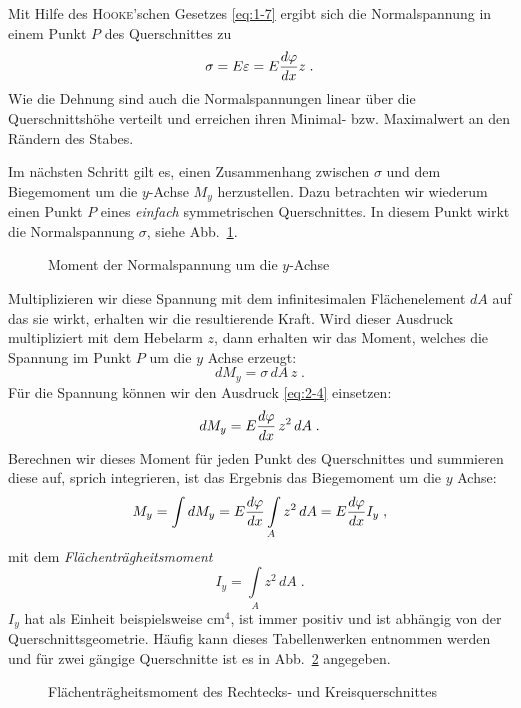 Mit Hilfe des \textsc{Hooke}'schen Gesetzes \eqref{eq:1-7} ergibt sich die Normalspannung in einem Punkt $P$ des Querschnittes zu
%
\begin{equation}
\sigma = E\varepsilon = E\dfrac{d\varphi}{dx}z \; .
\label{eq:2-4}
\end{equation}
%
Wie die Dehnung sind auch die Normalspannungen linear über die Querschnittshöhe verteilt und erreichen ihren Minimal- bzw. Maximalwert an den Rändern des Stabes.

Im nächsten Schritt gilt es, einen Zusammenhang zwischen $\sigma$ und dem Biegemoment um die $y$-Achse $M_y$ herzustellen.
Dazu betrachten wir wiederum einen Punkt $P$ eines \emph{einfach} symmetrischen Querschnittes.
In diesem Punkt wirkt die Normalspannung $\sigma$, siehe Abb.~\ref{fig:2-4}.
%
\begin{figure}[h!]
	\centering
	
	\caption{Moment der Normalspannung um die $y$-Achse}
	\label{fig:2-4}
\end{figure}
%
Multiplizieren wir diese Spannung mit dem infinitesimalen Flächenelement $dA$ auf das sie wirkt, erhalten wir die resultierende Kraft.
Wird dieser Ausdruck multipliziert mit dem Hebelarm $z$, dann erhalten wir das Moment, welches die Spannung im Punkt $P$ um die $y$ Achse erzeugt:
%
\begin{equation}
dM_y = \sigma \, dA \, z \; .
\label{eq:2-3}
\end{equation}
%
Für die Spannung können wir den Ausdruck \eqref{eq:2-4} einsetzen:
%
\begin{equation}
dM_y = E\dfrac{d\varphi}{dx}\,z^2\,dA \; .
\label{eq:2-5}
\end{equation}
%
Berechnen wir dieses Moment für jeden Punkt des Querschnittes und summieren diese auf, sprich integrieren, ist das Ergebnis das Biegemoment um die $y$ Achse:
%
\begin{equation}
M_y = \int dM_y = E\dfrac{d\varphi}{dx}\int\limits_A z^2\,dA = E\dfrac{d\varphi}{dx} I_y \; ,
\label{eq:2-6}
\end{equation}
%
mit dem \emph{Flächenträgheitsmoment}
%
\begin{equation}
I_y = \int\limits_A z^2\,dA \; .
\label{eq:2-8}
\end{equation}
%
$I_y$ hat als Einheit beispielsweise cm$^4$, ist immer positiv und ist abhängig von der Querschnittsgeometrie.
Häufig kann dieses Tabellenwerken entnommen werden und für zwei gängige Querschnitte ist es in Abb.~\ref{fig:2-5} angegeben.
%
\begin{figure}[h!]
	\centering
	
	\caption{Flächenträgheitsmoment des Rechtecks- und Kreisquerschnittes}
	\label{fig:2-5}
\end{figure}
%

